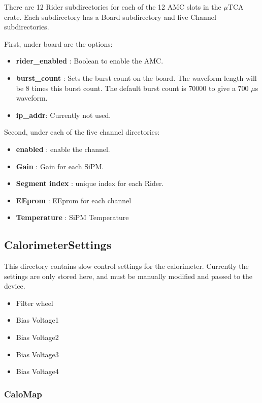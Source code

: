 There are 12 Rider subdirectories for each of the 12 AMC slots in the $\mu$TCA crate. Each subdirectory has a Board subdirectory and five Channel subdirectories. 

First, under board are the options:

\begin{itemize}
\item {\bf rider\_enabled} : Boolean to enable the AMC.
\item {\bf burst\_count} : Sets the burst count on the board. The waveform length will be 8 times this burst count. The default burst count is 70000 to give a 700 $\mu$s waveform.
\item {\bf ip\_addr}: Currently not used.
\end{itemize}

Second, under each of the five channel directories:

\begin{itemize}
\item {\bf enabled} : enable the channel.
\item {\bf Gain} : Gain for each SiPM.
\item {\bf Segment index} : unique index for each Rider.
\item {\bf EEprom} : EEprom for each channel
\item {\bf Temperature} : SiPM Temperature
\end{itemize}

\subsection{CalorimeterSettings}

This directory contains slow control settings for the calorimeter. Currently the settings are only stored here, and must be manually modified and passed to the device.

\begin{itemize}
\item Filter wheel
\item Bias Voltage1
\item Bias Voltage2
\item Bias Voltage3
\item Bias Voltage4
\end{itemize}

\subsubsection{CaloMap}

